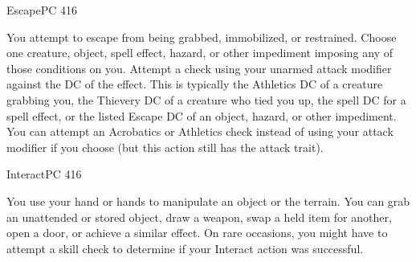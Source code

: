 \documentclass[12pt,openany,twocolumn]{book}
\begin{document}
\begin{action}{Escape}{}{PC 416}
    \begin{actioninfo}
    \end{actioninfo}

    \begin{actionbody}
        You attempt to escape from being grabbed, immobilized, or restrained. Choose one creature, object, spell effect, hazard, or other impediment imposing any of those conditions on you. Attempt a check using your unarmed attack modifier against the DC of the effect. This is typically the Athletics DC of a creature grabbing you, the Thievery DC of a creature who tied you up, the spell DC for a spell effect, or the listed Escape DC of an object, hazard, or other impediment. You can attempt an Acrobatics or Athletics check instead of using your attack modifier if you choose (but this action still has the attack trait).
    \end{actionbody}



\end{action}

\begin{action}{Interact}{}{PC 416}
    \begin{actioninfo}
    \end{actioninfo}

    \begin{actionbody}
        You use your hand or hands to manipulate an object or the terrain. You can grab an unattended or stored object, draw a weapon, swap a held item for another, open a door, or achieve a similar effect. On rare occasions, you might have to attempt a skill check to determine if your Interact action was successful.
    \end{actionbody}
\end{action}
\end{document}
